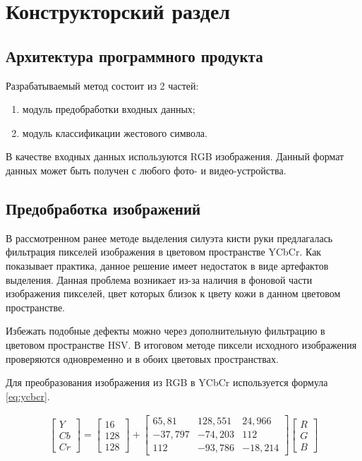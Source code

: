 \chapter{Конструкторский раздел}
\label{cha:design}

\section{Архитектура программного продукта}

Разрабатываемый метод состоит из 2 частей:

\begin{enumerate}
	\item модуль предобработки входных данных;
	\item модуль классификации жестового символа.
\end{enumerate}

В качестве входных данных используются RGB изображения. Данный формат данных может быть получен с любого фото- и видео-устройства.

\section{Предобработка изображений}

В рассмотренном ранее методе выделения силуэта кисти руки предлагалась фильтрация пикселей изображения в цветовом пространстве YCbCr. Как показывает практика, данное решение имеет недостаток в виде артефактов выделения. Данная проблема возникает из-за наличия в фоновой части изображения пикселей, цвет которых близок к цвету кожи в данном цветовом пространстве.

Избежать подобные дефекты можно через дополнительную фильтрацию в цветовом пространстве HSV\cite{Kolkur}. В итоговом методе пиксели исходного изображения проверяются одновременно и в обоих цветовых пространствах. 

Для преобразования изображения из RGB в YCbCr используется формула \ref{eq:ycbcr}.

\begin{eqnarray}\label{eq:ycbcr}
\begin{bmatrix}
Y\\Cb\\Cr
\end{bmatrix}
=
\begin{bmatrix}
16\\128\\128
\end{bmatrix}
+
\begin{bmatrix}
65,81 & 128,551 & 24,966 \\
-37,797 & -74,203 & 112\\
112 & -93,786 & -18,214
\end{bmatrix}
\begin{bmatrix}
R\\G\\B
\end{bmatrix}
\end{eqnarray}

